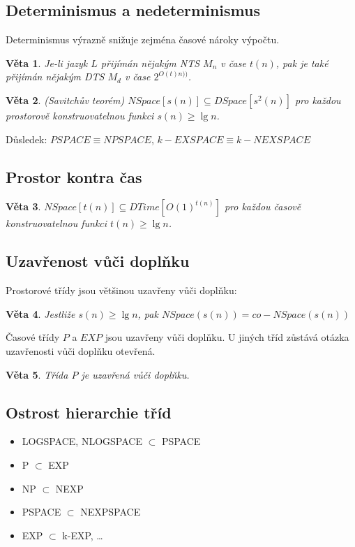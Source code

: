 \documentclass[a4paper, 11pt]{report}
\newtheorem{veta}{Věta}[chapter]
\begin{document}
\subsection{Determinismus a nedeterminismus}
Determinismus výrazně snižuje zejména časové nároky výpočtu.

\begin{veta}
Je-li jazyk $L$ přijímán nějakým NTS $M_n$ v čase $t(n)$, pak je také přijímán nějakým DTS $M_d$ v čase $2^{O(t)n))}$.
\end{veta}

\begin{veta}
(Savitchův teorém) $NSpace[s(n)] \subseteq DSpace[s^2(n)]$ pro každou prostorově konstruovatelnou funkci $s(n) \geq \lg{n}$.
\end{veta}
Důsledek: $PSPACE \equiv NPSPACE$, $k-EXSPACE \equiv k-NEXSPACE$

\subsection{Prostor kontra čas}
\begin{veta}
$NSpace[t(n)] \subseteq DTime[O(1)^{t(n)}]$ pro každou časově konstruovatelnou funkci $t(n) \geq \lg{n}$.
\end{veta}

\subsection{Uzavřenost vůči doplňku}

Prostorové třídy jsou většinou uzavřeny vůči doplňku:
\begin{veta}
Jestliže $s(n) \geq \lg{n}$, pak $NSpace(s(n)) = co-NSpace(s(n))$
\end{veta}

Časové třídy $P$ a $EXP$ jsou uzavřeny vůči doplňku. U jiných tříd zůstává otázka uzavřenosti vůči doplňku otevřená.

\begin{veta}
Třída $P$ je uzavřená vůči doplňku.
\end{veta}

\subsection{Ostrost hierarchie tříd}
\begin{itemize}
	\item LOGSPACE, NLOGSPACE $ \subset $ PSPACE
	\item P $ \subset $ EXP
	\item NP $ \subset $ NEXP
	\item PSPACE $ \subset $ NEXPSPACE
	\item EXP $ \subset $ k-EXP, \dots
\end{itemize}
\end{document}
